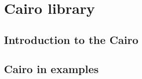 
\section{Cairo library}
\label{cairo}

\subsection{Introduction to the Cairo}

\subsection{Cairo in examples}
